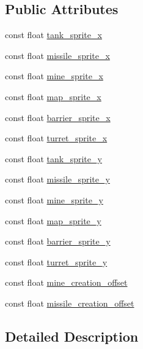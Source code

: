 \subsection*{Public Attributes}
\begin{DoxyCompactItemize}
\item 
const float \hyperlink{classSpriteDimensions_a9d7ddd6f707798f86ced573e28f9eea0}{tank\-\_\-sprite\-\_\-x}
\item 
const float \hyperlink{classSpriteDimensions_a0c406c32caf5ea7841c763100dd83ecf}{missile\-\_\-sprite\-\_\-x}
\item 
const float \hyperlink{classSpriteDimensions_af7f442b00b4a2d9d8b9ad47371a0018f}{mine\-\_\-sprite\-\_\-x}
\item 
const float \hyperlink{classSpriteDimensions_a69ff9ddd57b6fe4af120278bcece5439}{map\-\_\-sprite\-\_\-x}
\item 
const float \hyperlink{classSpriteDimensions_abcc491d376f31d36013e4f2396dbc408}{barrier\-\_\-sprite\-\_\-x}
\item 
const float \hyperlink{classSpriteDimensions_ad876e1e5dea420fe80462709c8ec2d5c}{turret\-\_\-sprite\-\_\-x}
\item 
const float \hyperlink{classSpriteDimensions_abe1930e59ce44b9bdc0e6b363b668f7d}{tank\-\_\-sprite\-\_\-y}
\item 
const float \hyperlink{classSpriteDimensions_adcf501d11ae383d24cbbe5b526585f86}{missile\-\_\-sprite\-\_\-y}
\item 
const float \hyperlink{classSpriteDimensions_a256b5245430fc54ae2cace272260dbe1}{mine\-\_\-sprite\-\_\-y}
\item 
const float \hyperlink{classSpriteDimensions_a33014d94b303afe312e1a4b2fb5e437f}{map\-\_\-sprite\-\_\-y}
\item 
const float \hyperlink{classSpriteDimensions_abad79766e2254e365d3455b3471a5d0a}{barrier\-\_\-sprite\-\_\-y}
\item 
const float \hyperlink{classSpriteDimensions_a1b808c73bd915776ec6b8c10120adeae}{turret\-\_\-sprite\-\_\-y}
\item 
const float \hyperlink{classSpriteDimensions_a01c7c9dc1498f3336671b1ca697a7342}{mine\-\_\-creation\-\_\-offset}
\item 
const float \hyperlink{classSpriteDimensions_a59055b28d0d2307c1e4f4b04ad93488e}{missile\-\_\-creation\-\_\-offset}
\end{DoxyCompactItemize}


\subsection{Detailed Description}


